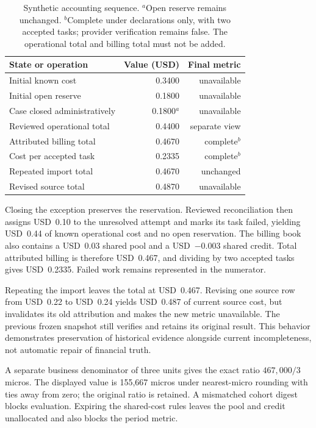 \documentclass[10pt,twocolumn]{article}
\begin{document}
\begin{table}[t]
\centering\small
\begin{tabularx}{\columnwidth}{@{}Yrr@{}}
\toprule
State or operation & Value (USD) & Final metric\\
\midrule
Initial known cost & 0.3400 & unavailable\\
Initial open reserve & 0.1800 & unavailable\\
Case closed administratively & 0.1800$^{a}$ & unavailable\\
Reviewed operational total & 0.4400 & separate view\\
Attributed billing total & 0.4670 & complete$^{b}$\\
Cost per accepted task & 0.2335 & complete$^{b}$\\
Repeated import total & 0.4670 & unchanged\\
Revised source total & 0.4870 & unavailable\\
\bottomrule
\end{tabularx}
\caption{Synthetic accounting sequence. $^{a}$Open reserve remains unchanged. $^{b}$Complete under declarations only, with two accepted tasks; provider verification remains false. The operational total and billing total must not be added.}
\label{tab:sequence}
\end{table}

Closing the exception preserves the reservation. Reviewed reconciliation then assigns USD~0.10 to the unresolved attempt and marks its task failed, yielding USD~0.44 of known operational cost and no open reservation. The billing book also contains a USD~0.03 shared pool and a USD~$-0.003$ shared credit. Total attributed billing is therefore USD~0.467, and dividing by two accepted tasks gives USD~0.2335. Failed work remains represented in the numerator.

Repeating the import leaves the total at USD~0.467. Revising one source row from USD~0.22 to USD~0.24 yields USD~0.487 of current source cost, but invalidates its old attribution and makes the new metric unavailable. The previous frozen snapshot still verifies and retains its original result. This behavior demonstrates preservation of historical evidence alongside current incompleteness, not automatic repair of financial truth.

A separate business denominator of three units gives the exact ratio $467{,}000/3$ micros. The displayed value is 155,667 micros under nearest-micro rounding with ties away from zero; the original ratio is retained. A mismatched cohort digest blocks evaluation. Expiring the shared-cost rules leaves the pool and credit unallocated and also blocks the period metric.
\end{document}

